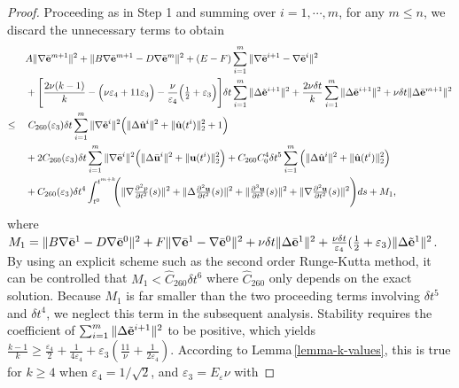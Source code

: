 \documentclass{article}
\theoremstyle{definition}                   %
\begin{document}
\begin{proof}
Proceeding as in Step 1 and summing over 
$i=1,\cdots, m$, for any $m\le n$,  we discard the unnecessary terms to obtain
\begin{align}
& A\|\nabla\bar{\bf{e}}^{m+1}\|^2 
+ \|B\nabla\bar{\bf{e}}^{m+1} - D\nabla\bar{\bf{e}}^m\|^2
+(E-F) \sum_{i=1}^m \|\nabla\bar{\bf{e}}^{i+1} - \nabla\bar{\bf{e}}^i \|^2
\notag\\
&+ \Biggl[
  \frac{2\nu (k-1)}{k}
  - \Bigl( \nu\varepsilon_4 + 11 \varepsilon_3\Bigr)
  - \frac{\nu }{\varepsilon_4}\Bigl(\tfrac{1}{2} +      \varepsilon_3\Bigr)
\Biggr]\delta t \sum_{i=1}^m \|\Delta \tilde{\bf e}^{i+1}\|^2 
+\frac{2\nu\delta t}{k} \sum_{i=1}^m \|\Delta\bar{\bf{e}}^{i+1}\|^2
+\nu\delta t \|\Delta\bar{\bf{e}}^{m+1}\|^2
\notag\\
\le \quad  &\;
C_{260}(\varepsilon_3) \delta t 
\sum_{i=1}^m \|\nabla\tilde{\bf{e}}^i\|^2 
\Big(\|\Delta\hat{\bf{u}}^i\|^2 + \|\hat{\bf{u}}(t^i)\|^2_2 + 1 \Big)
\notag\\
& +2C_{260}(\varepsilon_3) \delta t \sum_{i=1}^m \|\nabla\bar{\bf{e}}^i\|^2 
\Big(\|\Delta\bar{\bf{u}}^i\|^2 + \|{\bf{u}}(t^i)\|^2_2 \Big)
+ C_{260} C_0^4\delta t^5 \sum_{i=1}^m \Big( \|\Delta\hat{\bf{u}}^i\|^2 
+ \|\hat{\bf{u}}(t^i)\|^2_2\Big)
\notag\\
&+ C_{260} (\varepsilon_3) \delta t^4 
\int_{t^{0}}^{t^{m+k}}\!\!
\Biggl(
\|\nabla \tfrac{\partial^2 p}{\partial t^2}(s)\|^2
+ \|\Delta \tfrac{\partial^2 \bf{u}}{\partial t^2}(s)\|^2
+ \|\tfrac{\partial^3 \bf{u}}{\partial t^3}(s)\|^2
+ \|\nabla \tfrac{\partial^2 \bf{u}}{\partial t^2}(s)\|^2
\Biggr) ds + M_1,
\label{cat0125}
\end{align}
where $M_1=
\| B\nabla\bar{\bf e}^1 - D \nabla\bar{\bf e}^0\|^2
+ F \|\nabla\bar{\bf e}^1 - \nabla\bar{\bf e}^0  \|^2
+\nu\delta t \|\Delta\bar{\bf e}^1 \|^2
+ \frac{\nu \delta t}{\varepsilon_4} (\frac{1}{2}+\varepsilon_3) \| \Delta\tilde{\bf e}^1 \|^2$. By using an explicit scheme such as the second order Runge-Kutta method, it can be controlled that $M_1<\hat{C}_{260} \delta t^6$ where $\hat{C}_{260}$ only depends on the exact solution. Because $M_1$ is far smaller than the two proceeding terms involving $\delta t^5$ and $\delta t^4$, we neglect this term in the subsequent analysis. 
%
Stability requires the coefficient of
$\sum_{i=1}^m \|\Delta \tilde{\bf e}^{i+1}\|^2$ to be positive, which yields 
$
\frac{k-1}{k} \ge \frac{\varepsilon_4}{2} + \frac{1}{4\varepsilon_4} + \varepsilon_3 \left(\frac{11}{\nu} + \frac{1}{2\varepsilon_4}\right)$. 
According to Lemma\,\ref{lemma-k-values}, this is true for $k\ge 4$ when  $\varepsilon_4 = 1/\sqrt{2}$,  and $\varepsilon_3 =E_\varepsilon \nu$ with 

\end{proof}
\end{document}
